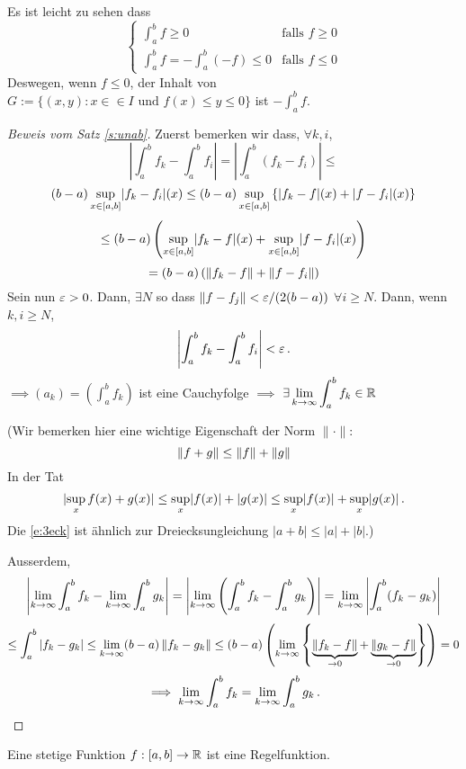 \begin{Bem} Es ist leicht zu sehen dass
  \[ \begin{cases}
    \int_a^bf\geq 0&  \mbox{falls }f\geq 0\\
    \int_a^bf = -\int_a^b (-f) \leq 0& \mbox{falls } f\leq 0
  \end{cases}\]
Deswegen, wenn $f\leq 0$, der Inhalt von $G:=\{(x,y): x\in \in I \mbox{ und } f(x) \leq y \leq 0\}$
ist $- \int_a^b f$.
\end{Bem}
\begin{proof}[Beweis vom Satz \ref{s:unab}] Zuerst bemerken wir dass, $\forall k, i$,
\[\left|\int_a^bf_k-\int_a^bf_i\right|=\left|\int_a^b(f_k-f_i)\right|\leq\]
\[(b-a) \sup_{x\in[a,b]}\mathopen| f_k-f_i \mathclose|(x)\leq (b-a) 
\sup_{x\in[a,b]}\left\{ \mathopen| f_k-f \mathclose|(x)+\mathopen| f-f_i \mathclose|(x) \right\}\]
  \[\leq (b-a) \left(\sup_{x\in[a,b]}\mathopen| f_k-f \mathclose|(x)+\sup_{x\in[a,b]}\mathopen| f-f_i \mathclose|(x)\right)\]
  \[=(b-a) \left(\left\| f_k-f \right\|+\left\| f-f_i \right\|\right) \]
Sein nun $\varepsilon>0$. Dann, $\exists N$ so dass $\|f-f_j\| < \varepsilon/(2(b-a))$ $\forall i\geq N$.
Dann, wenn $k,i\geq N$,
\[
\left|\int_a^bf_k-\int_a^bf_i\right| < \varepsilon\, .
\]
$\implies (a_k)=\left( \int_a^bf_k \right)$ ist eine Cauchyfolge 
$\implies$ $\exists \displaystyle\lim_{k\rightarrow\infty}\int_a^bf_k\in\mathbb{R}$

\medskip

(Wir bemerken hier eine wichtige Eigenschaft der Norm $\|\cdot\|$:
\begin{equation}\label{e:3eck}
\left\| f+g \right\|\leq \left\| f \right\|+\left\| g \right\|
\end{equation}
In der Tat 
\[\mathopen| \sup_xf(x)+g(x) \mathclose|\leq \sup_x\mathopen| f(x) \mathclose|+\mathopen| g(x) \mathclose|\leq\sup_x\mathopen| f(x) \mathclose|+\sup_x\mathopen| g(x) \mathclose|\, .\]
Die \eqref{e:3eck} ist \"ahnlich zur Dreiecksungleichung $|a+b|\leq |a|+|b|$.)

\medskip

Ausserdem,
\[\left|\displaystyle\lim_{k\rightarrow\infty}\int_a^bf_k-\displaystyle\lim_{k\rightarrow\infty}\int_a^bg_k\right|
=\left|\displaystyle\lim_{k\rightarrow\infty}\left( \int_a^bf_k-\int_a^bg_k \right)\right|
=\displaystyle\lim_{k\rightarrow\infty}\left|\int_a^b(f_k-g_k)\right|\]
\[\leq \int_a^b |f_k-g_k| \leq\displaystyle\lim_{k\rightarrow\infty} (b-a) \left\| f_k-g_k \right\|
\leq (b-a) \left(\displaystyle\lim_{k\rightarrow\infty}\left\{ \underbrace{\left\| f_k-f \right\|}_{\to 0}+\underbrace{\left\| g_k-f \right\|}_{\to 0} \right\}\right)=0\]
  \[\implies \displaystyle\lim_{k\rightarrow\infty}\int_a^bf_k=\displaystyle\lim_{k\rightarrow\infty}\int_a^bg_k\, .\]
\end{proof}
\begin{Sat}
  Eine stetige Funktion $f:[a,b]\to\mathbb{R}$ ist eine Regelfunktion.
\end{Sat}
